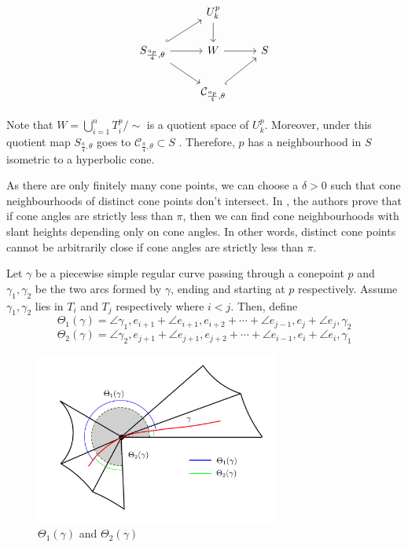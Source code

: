 \[\begin{tikzcd}
	& {U_k^p} \\
	{S_{\frac{a_p}{4}, \theta}} & W & S \\
	& {\mathcal{C}_{\frac{a_p}{4}, \theta}}
	\arrow[from=2-1, to=3-2]
	\arrow[hook', from=3-2, to=2-3]
	\arrow[from=2-1, to=2-2]
	\arrow[from=2-2, to=2-3]
	\arrow[hook, from=2-1, to=1-2]
	\arrow[from=1-2, to=2-2]
\end{tikzcd}\]


Note that $W = \bigcup_{i=1}^n T^p_i/ \sim$ is a quotient space of $U^p_k$. Moreover, under this quotient map $S_{\frac{a}{4}, \theta}$ goes to $\mathcal{C}_{\frac{a}{4}, \theta} \subset S$ . Therefore, $p$ has a neighbourhood in $S$ isometric to a hyperbolic cone. 

\begin{remark}\label{rem:disjoint_cone_nbhds}
	As there are only finitely many cone points, we can choose a $\delta > 0$ such that cone neighbourhoods of distinct cone points don't intersect. In \cite{PARLIER}, the authors prove that if cone angles are strictly less than $\pi$, then we can find cone neighbourhoods with slant heights depending only on cone angles. In other words, distinct cone points cannot be arbitrarily close if cone angles are strictly less than $\pi$.
\end{remark}

Let $\gamma$ be a piecewise simple regular curve passing through a conepoint $p$ and $\gamma_1, \gamma_2$ be the two arcs formed by $\gamma$, ending and starting at $p$ respectively. Assume $\gamma_1, \gamma_2$ lies in $T_i$ and $T_j$ respectively where $i < j$. Then, define
$$\Theta_1(\gamma) = \angle \gamma_1, e_{i+1} + \angle e_{i+1}, e_{i+2}+\cdots+\angle e_{j-1},e_{j} + \angle e_{j}, \gamma_2  $$
$$\Theta_2(\gamma) = \angle \gamma_2, e_{j+1} + \angle e_{j+1}, e_{j+2}+\cdots+\angle e_{i-1},e_{i} + \angle e_{i}, \gamma_1  $$

\begin{figure}[h]
	\includegraphics[width=8cm]{Chapter1/conenbhd2.pdf}
	\caption{$\Theta_1(\gamma)$ and $\Theta_2(\gamma)$}
	\label{fig:cone2}
\end{figure}

